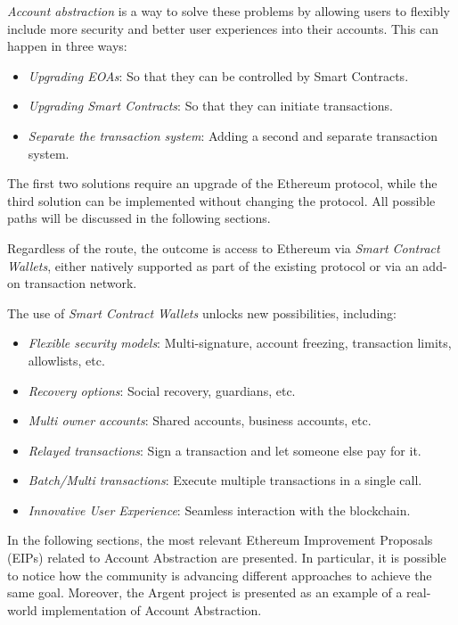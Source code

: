 \textit{Account abstraction} is a way to solve these problems by allowing users to flexibly include more security and better user experiences into their accounts. This can happen in three ways: \cite{ethereum-account-abstraction}
\begin{itemize}
    \item \textit{Upgrading EOAs}: So that they can be controlled by Smart Contracts.
    \item \textit{Upgrading Smart Contracts}: So that they can initiate transactions. 
    \item \textit{Separate the transaction system}: Adding a second and separate transaction system.
\end{itemize}

The first two solutions require an upgrade of the Ethereum protocol, while the third solution can be implemented without changing the protocol.\cite{ethereum-account-abstraction} All possible paths will be discussed in the following sections.

Regardless of the route, the outcome is access to Ethereum via \textit{Smart Contract Wallets}, either natively supported as part of the existing protocol or via an add-on transaction network.  \cite{ethereum-account-abstraction}

The use of \textit{Smart Contract Wallets}  unlocks new possibilities, including: \cite{ethereum-account-abstraction}
\begin{itemize}
    \item \textit{Flexible security models}: Multi-signature, account freezing, transaction limits, allowlists, etc.
    \item \textit{Recovery options}: Social recovery, guardians, etc.
    \item \textit{Multi owner accounts}: Shared accounts, business accounts, etc.
    \item \textit{Relayed transactions}: Sign a transaction and let someone else pay for it.
    \item \textit{Batch/Multi transactions}: Execute multiple transactions in a single call.
    \item \textit{Innovative User Experience}: Seamless interaction with the blockchain.
\end{itemize}


In the following sections, the most relevant Ethereum Improvement Proposals (EIPs) related to Account Abstraction are presented. In particular, it is possible to notice how the community is advancing different approaches to achieve the same goal. Moreover, the Argent project is presented as an example of a real-world implementation of Account Abstraction.

